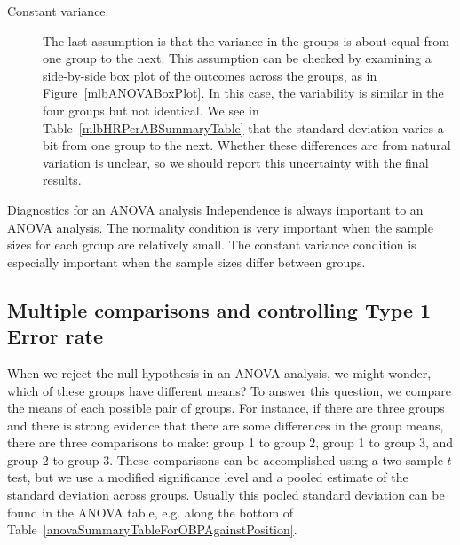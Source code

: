 \begin{description}
\item[Constant variance.] The last assumption is that the variance in the groups is about equal from one group to the next. This assumption can be checked by examining a side-by-side box plot of the outcomes across the groups, as in Figure~\vref{mlbANOVABoxPlot}. In this case, the variability is similar in the four groups but not identical. We see in Table~\vref{mlbHRPerABSummaryTable} that the standard deviation varies a bit from one group to the next. Whether these differences are from natural variation is unclear, so we should report this uncertainty with the final results.


\end{description}

\begin{caution}
{Diagnostics for an ANOVA analysis}
{Independence is always important to an ANOVA analysis. The normality condition is very important when the sample sizes for each group are relatively small. The constant variance condition is especially important when the sample sizes differ between groups.}
\end{caution}


\subsection{Multiple comparisons and controlling Type 1 Error rate}
\label{multipleComparisonsAndControllingTheType1ErrorRate}


When we reject the null hypothesis in an ANOVA analysis, we might wonder, which of these groups have different means? To answer this question, we compare the means of each possible pair of groups. For instance, if there are three groups and there is strong evidence that there are some differences in the group means, there are three comparisons to make: group 1 to group 2, group 1 to group 3, and group 2 to group 3. These comparisons can be accomplished using a two-sample $t$ test, but we use a modified significance level and a pooled estimate of the standard deviation across groups. Usually this pooled standard deviation can be found in the ANOVA table, e.g. along the bottom of Table~\ref{anovaSummaryTableForOBPAgainstPosition}.

\textB{\newpage}

